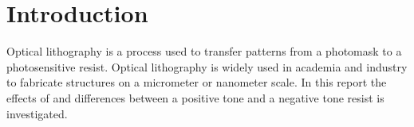 \section*{Introduction}
Optical lithography is a process used to transfer patterns from a photomask to a photosensitive resist. Optical lithography is widely used in academia and industry to fabricate structures on a micrometer or nanometer scale. In this report the effects of and differences between a positive tone and a negative tone resist is investigated.